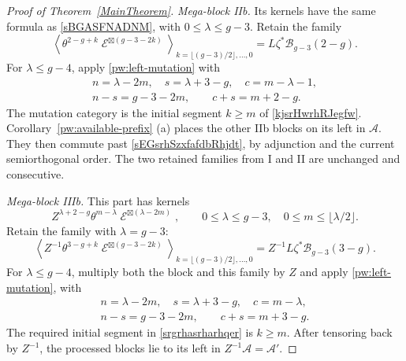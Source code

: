 \documentclass[10pt,a4paper]{amsart}
\DeclareMathOperator{\cE}{\mathcal{E}}
\begin{document}
\begin{proof}[Proof of Theorem~\ref{MainTheorem}]
\smallskip
\noindent\textit{Mega-block IIb.}
Its kernels have the same formula as \eqref{sBGASFNADNM}, with
$0\leq\lambda\leq g-3$.  Retain the  family
\begin{equation}\label{kjsrHwrhRJegfw}
 \left\langle\theta^{2-g+k}\cE^{\boxtimes(g-3-2k)}
 \right\rangle_{k=\lfloor(g-3)/2\rfloor,\ldots,0}
       =L\zeta^*\mathcal B_{g-3}(2-g).
\end{equation}
For $\lambda\leq g-4$, apply \eqref{pw:left-mutation} with
\[
 \begin{gathered}
 n=\lambda-2m,\quad s=\lambda+3-g,\quad c=m-\lambda-1,\\
 n-s=g-3-2m,\qquad c+s=m+2-g.
 \end{gathered}
\]
The mutation category is the initial segment $k\geq m$ of
\eqref{kjsrHwrhRJegfw}.  
Corollary~\ref{pw:available-prefix} (a)
places the other IIb blocks on its left in $\mathcal A$.
They then commute past \eqref{sEGsrhSzxfafdbRhjdt}, by adjunction
and the current semiorthogonal order.  The two retained families
from I and II are unchanged and consecutive.

\smallskip
\noindent\textit{Mega-block IIIb.}
This part has kernels
\[
 Z^{\lambda+2-g}\theta^{m-\lambda}
       \cE^{\boxtimes(\lambda-2m)},\qquad
 0\leq\lambda\leq g-3,\quad0\leq m\leq\lfloor\lambda/2\rfloor.
\]
Retain the family with $\lambda=g-3$:
\begin{equation}\label{srgrhasrharhqer}
 \left\langle Z^{-1}\theta^{3-g+k}\cE^{\boxtimes(g-3-2k)}
 \right\rangle_{k=\lfloor(g-3)/2\rfloor,\ldots,0}
       =Z^{-1}L\zeta^*\mathcal B_{g-3}(3-g).
\end{equation}
For $\lambda\leq g-4$, multiply both the block and this family by
$Z$ and apply \eqref{pw:left-mutation}, with
\[
 \begin{gathered}
 n=\lambda-2m,\quad s=\lambda+3-g,\quad c=m-\lambda,\\
 n-s=g-3-2m,\qquad c+s=m+3-g.
 \end{gathered}
\]
The required initial segment in \eqref{srgrhasrharhqer} is $k\geq m$.
After tensoring back by $Z^{-1}$, the processed blocks lie to its
left in $Z^{-1}\mathcal A=\mathcal A'$.


\end{proof}
\end{document}
